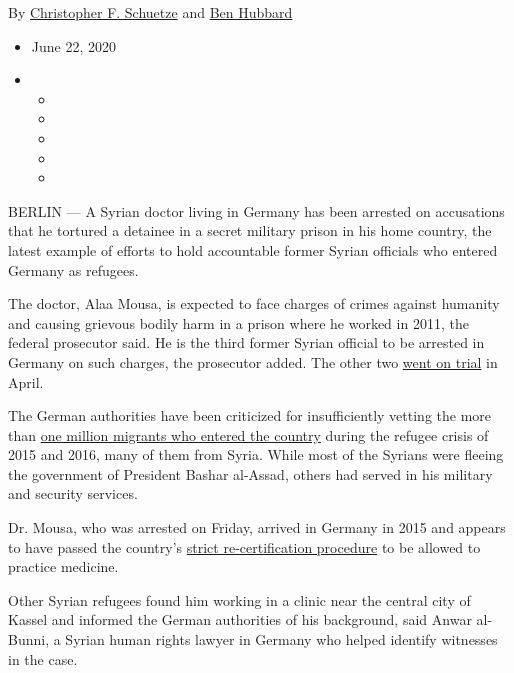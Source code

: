 By
\href{https://www.nytimes3xbfgragh.onion/by/christopher-f-schuetze}{Christopher
F. Schuetze} and
\href{https://www.nytimes3xbfgragh.onion/by/ben-hubbard}{Ben Hubbard}

\begin{itemize}
\item
  June 22, 2020
\item
  \begin{itemize}
  \item
  \item
  \item
  \item
  \item
  \end{itemize}
\end{itemize}

BERLIN --- A Syrian doctor living in Germany has been arrested on
accusations that he tortured a detainee in a secret military prison in
his home country, the latest example of efforts to hold accountable
former Syrian officials who entered Germany as refugees.

The doctor, Alaa Mousa, is expected to face charges of crimes against
humanity and causing grievous bodily harm in a prison where he worked in
2011, the federal prosecutor said. He is the third former Syrian
official to be arrested in Germany on such charges, the prosecutor
added. The other two
\href{https://www.nytimes3xbfgragh.onion/2020/04/23/world/middleeast/syria-germany-war-crimes-trial.html}{went
on trial} in April.

The German authorities have been criticized for insufficiently vetting
the more than
\href{https://www.nytimes3xbfgragh.onion/2016/04/28/world/europe/germany-migrants-struggles-to-integrate.html}{one
million migrants who entered the country} during the refugee crisis of
2015 and 2016, many of them from Syria. While most of the Syrians were
fleeing the government of President Bashar al-Assad, others had served
in his military and security services.

Dr. Mousa, who was arrested on Friday, arrived in Germany in 2015 and
appears to have passed the country's
\href{https://www.nytimes3xbfgragh.onion/2018/09/08/world/europe/germany-refugees-doctors.html}{strict
re-certification procedure} to be allowed to practice medicine.

Other Syrian refugees found him working in a clinic near the central
city of Kassel and informed the German authorities of his background,
said Anwar al-Bunni, a Syrian human rights lawyer in Germany who helped
identify witnesses in the case.

